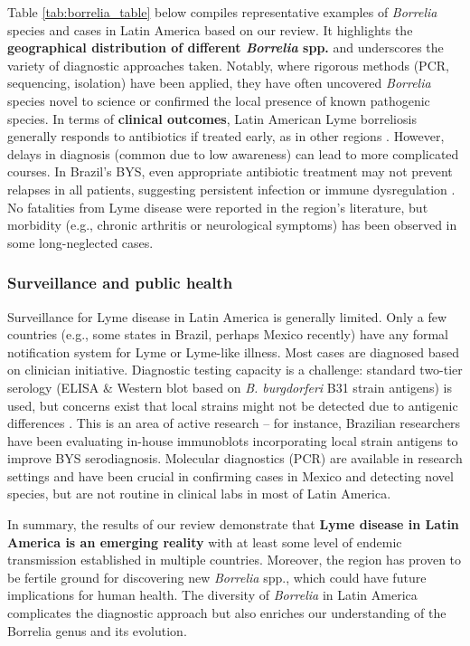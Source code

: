 \documentclass[11pt,letterpaper]{article}
\begin{document}
Table \ref{tab:borrelia_table} below compiles representative examples of \textit{Borrelia} species and cases in Latin America based on our review. It highlights the \textbf{geographical distribution of different \textit{Borrelia} spp.} and underscores the variety of diagnostic approaches taken. Notably, where rigorous methods (PCR, sequencing, isolation) have been applied, they have often uncovered \textit{Borrelia} species novel to science or confirmed the local presence of known pathogenic species. In terms of \textbf{clinical outcomes}, Latin American Lyme borreliosis generally responds to antibiotics if treated early, as in other regions \citep{Yoshinari2022x}. However, delays in diagnosis (common due to low awareness) can lead to more complicated courses. In Brazil's BYS, even appropriate antibiotic treatment may not prevent relapses in all patients, suggesting persistent infection or immune dysregulation \citep{Yoshinari2022y, Yoshinari2022z}. No fatalities from Lyme disease were reported in the region's literature, but morbidity (e.g., chronic arthritis or neurological symptoms) has been observed in some long-neglected cases.

\subsubsection{Surveillance and public health}
Surveillance for Lyme disease in Latin America is generally limited. Only a few countries (e.g., some states in Brazil, perhaps Mexico recently) have any formal notification system for Lyme or Lyme-like illness. Most cases are diagnosed based on clinician initiative. Diagnostic testing capacity is a challenge: standard two-tier serology (ELISA \& Western blot based on \textit{B. burgdorferi} B31 strain antigens) is used, but concerns exist that local strains might not be detected due to antigenic differences \citep{Yoshinari2022aa}. This is an area of active research – for instance, Brazilian researchers have been evaluating in-house immunoblots incorporating local strain antigens to improve BYS serodiagnosis. Molecular diagnostics (PCR) are available in research settings and have been crucial in confirming cases in Mexico and detecting novel species, but are not routine in clinical labs in most of Latin America.

In summary, the results of our review demonstrate that \textbf{Lyme disease in Latin America is an emerging reality} with at least some level of endemic transmission established in multiple countries. Moreover, the region has proven to be fertile ground for discovering new \textit{Borrelia} spp., which could have future implications for human health. The diversity of \textit{Borrelia} in Latin America complicates the diagnostic approach but also enriches our understanding of the Borrelia genus and its evolution.
\end{document}
